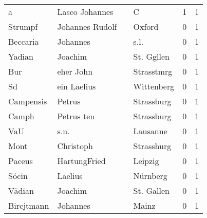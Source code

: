 \documentclass[10pt,a4paper,landscape]{article}
\begin{document}
\begin{longtable}{llllrr}
                        a &                     Lasco Johannes &             &                                           C &          1 &         1 \\
                  Strumpf &                    Johannes Rudolf &             &                                      Oxford &          0 &         1 \\
                 Beccaria &                           Johannes &             &                                        s.l. &          0 &         1 \\
                   Yadian &                            Joachim &             &                                  St. Ggllen &          0 &         1 \\
                      Bur &                          eher John &             &                                  Strasstmrg &          0 &         1 \\
                       Sd &                        ein Laelius &             &                                  Wittenberg &          0 &         1 \\
                Campensis &                             Petrus &             &                                  Strassburg &          0 &         1 \\
                    Camph &                         Petrus ten &             &                                  Strassburg &          0 &         1 \\
                      VaU &                               s.n. &             &                                    Lausanne &          0 &         1 \\
                     Mont &                          Christoph &             &                                  Strasshurg &          0 &         1 \\
                   Paceus &                       HartungFried &             &                                     Leipzig &          0 &         1 \\
                    Söcin &                            Laelius &             &                                    Nürnberg &          0 &         1 \\
                   Vädian &                            Joachim &             &                                  St. Gallen &          0 &         1 \\
               Bircjtmann &                           Johannes &             &                                       Mainz &          0 &         1 \\

\end{longtable}
\end{document}
